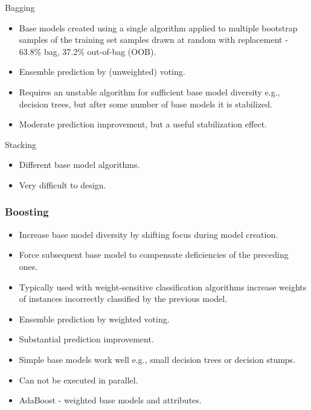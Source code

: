 \documentclass[proffesionalfonts]{beamer}
\begin{document}
\begin{frame}
\begin{block}{Bagging}
\begin{itemize}
\item Base models created using a single algorithm applied to multiple bootstrap samples of the training set samples drawn at random with replacement - 63.8\% bag, 37.2\% out-of-bag (OOB).
\item Ensemble prediction by (unweighted) voting.
\item Requires an unstable algorithm for sufficient base model diversity e.g., decision trees, but after some number of base models it is stabilized.
\item Moderate prediction improvement, but a useful stabilization effect.
\end{itemize}
\end{block}
\begin{block}{Stacking}
\begin{itemize}
\item Different base model algorithms.
\item Very difficult to design.
\end{itemize}
\end{block}
\end{frame}

\begin{frame}
\frametitle{Boosting}
\begin{block}{}
\begin{itemize}
\item Increase base model diversity by shifting focus during model creation.
\item Force subsequent base model to compensate deficiencies of the preceding ones.
\item Typically used with weight-sensitive classification algorithms increase weights of instances incorrectly classified by the previous model.
\item Ensemble prediction by weighted voting.
\item Substantial prediction improvement.
\item Simple base models work well e.g., small decision trees or decision stumps.
\item Can not be executed in parallel.
\item AdaBoost - weighted base models and attributes.
\end{itemize}
\end{block}
\end{frame}
\end{document}
